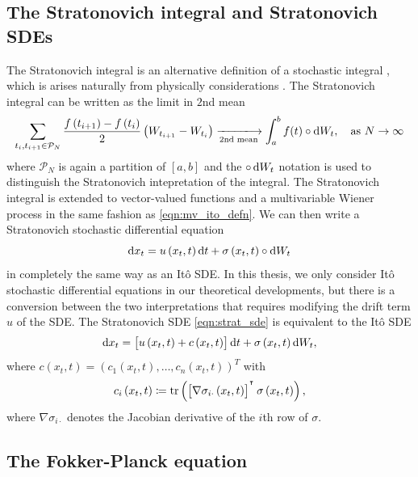 \subsection{The Stratonovich integral and Stratonovich SDEs}
The Stratonovich integral is an alternative definition of a stochastic integral \citehere, which is arises naturally from physically considerations \citep{}.
The Stratonovich integral can be written as the limit in \(2\)nd mean
\[
	\sum_{t_i, t_{i+1} \in \mathcal{P}_N}{\frac{f\left(t_{i+1}\right) - f\left(t_i\right)}{2}\left(W_{t_{i+1}} - W_{t_i}\right)} \xlongrightarrow[2\text{nd mean}]{} \int_a^{b}{f(t)\circ\dif W_t}, \quad \text{as } N \to \infty
\]
where \(\mathcal{P}_N\) is again a partition of \([a,b]\) and the \(\circ \dif W_t\) notation is used to distinguish the Stratonovich intepretation of the integral.
The Stratonovich integral is extended to vector-valued functions and a multivariable Wiener process in the same fashion as \eqref{eqn:mv_ito_defn}.
We can then write a Stratonovich stochastic differential equation
\begin{equation}
	\dif x_t = u\left(x_t, t\right)\dif t + \sigma\left(x_t, t\right)\circ \dif W_t
	\label{eqn:strat_sde}
\end{equation}
in completely the same way as an It\^o SDE.
In this thesis, we only consider It\^o stochastic differential equations in our theoretical developments, but there is a conversion between the two interpretations that requires modifying the drift term \(u\) of the SDE.
The Stratonovich SDE \eqref{eqn:strat_sde} is equivalent to the It\^o SDE \citehere
\begin{equation}
	\dif x_t = \left[u\left(x_t, t\right) + c\left(x_t, t\right)\right]\dif t + \sigma\left(x_t, t\right)\dif W_t,
	\label{eqn:strat_ito_conv}
\end{equation}
where \(c\left(x_t, t\right) = \left(c_1\left(x_t, t\right), \dotsc, c_n\left(x_t, t\right)\right)^T\) with
\[
	c_i\left(x_t, t\right) \coloneqq \mathrm{tr}\left(\left[\nabla\sigma_{i\cdot}\left(x_t, t\right)\right]^{^{\intercal}}\sigma\left(x_t, t\right)\right),
\]
where \(\nabla \sigma_{i\cdot}\) denotes the Jacobian derivative of the \(i\)th row of \(\sigma\).


\subsection{The Fokker-Planck equation}


